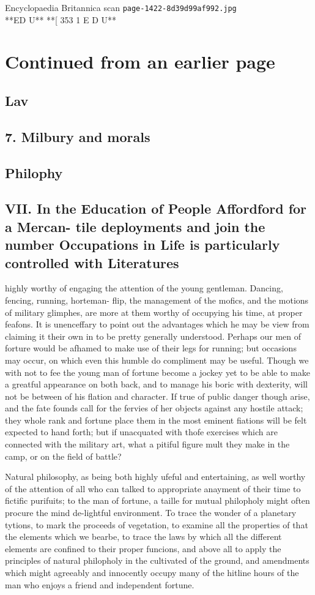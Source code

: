 \documentclass{article}
\begin{document}
\begin{center}
{\Large Encyclopaedia Britannica scan \texttt{page-1422-8d39d99af992.jpg}}\\[0.5em]
**ED U** **[ 353 1 E D U**
\end{center}
\section*{Continued from an earlier page}
\subsection*{Lav}
\subsection*{7. Milbury and morals}
\subsection*{Philophy}
\subsection*{VII. In the Education of People Affordford for a Mercan- tile deployments and join the number Occupations in Life is particularly controlled with Literatures}
highly worthy of engaging the attention of the young gentleman. Dancing, fencing, running, horteman- flip, the management of the mofics, and the motions of military glimphes, are more at them worthy of occupying his time, at proper feafons. It is unenceffary to point out the advantages which he may be view from claiming it their own in to be pretty generally understood. Perhaps our men of forture would be afhamed to make use of their legs for running; but occasions may occur, on which even this humble do compliment may be useful. Though we with not to fee the young man of fortune become a jockey yet to be able to make a greatful appearance on both back, and to manage his boric with dexterity, will not be between of his flation and character. If true of public danger though arise, and the fate founds call for the fervies of her objects against any hostile attack; they whole rank and fortune place them in the most eminent fiations will be felt expected to hand forth; but if unacquated with thofe exercises which are connected with the military art, what a pitiful figure mult they make in the camp, or on the field of battle?

Natural philosophy, as being both highly ufeful and entertaining, as well worthy of the attention of all who can talked to appropriate anayment of their time to fictific purifuits; to the man of fortune, a taille for mutual philopholy might often procure the mind de-lightful environment. To trace the wonder of a planetary tytions, to mark the proceeds of vegetation, to examine all the properties of that the elements which we bearbe, to trace the laws by which all the different elements are confined to their proper funcions, and above all to apply the principles of natural philopholy in the cultivated of the ground, and amendments which might agreeably and innocently occupy many of the hitline hours of the man who enjoys a friend and independent fortune.
\end{document}
